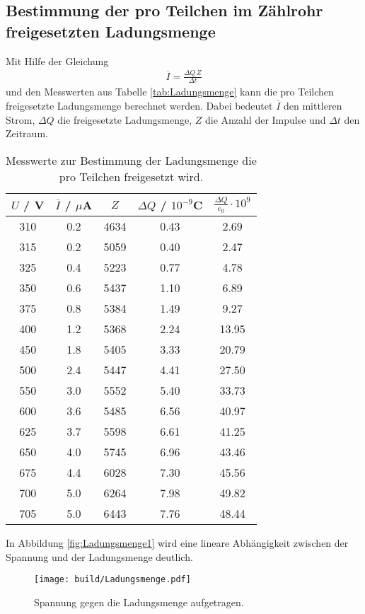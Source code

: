 \subsection{Bestimmung der pro Teilchen im Zählrohr freigesetzten Ladungsmenge}
Mit Hilfe der Gleichung
\begin{align*}
  \overline{I} = \frac{\Delta Q\,Z}{\Delta t}
\end{align*}
und den Messwerten aus Tabelle \eqref{tab:Ladungsmenge} kann die pro Teilchen freigesetzte Ladungsmenge berechnet werden. Dabei bedeutet $\overline{I}$ den mittleren Strom, $\Delta Q$ die freigesetzte Ladungsmenge, $Z$ die Anzahl der Impulse und $\Delta t$ den Zeitraum.

\begin{table}[H]
  \centering
  \begin{tabular}{c|c|c|c|c}
    \hline
    $U$ / V & $\overline{I}$ / $\mu$A & $Z$ & $\Delta Q$ / $10^{-9}$C & $\frac{\Delta Q}{e_0}\cdot10^{9}$ \\
    \hline
    310 & 0.2 & 4634 & 0.43 &  2.69 \\
    315 & 0.2 & 5059 & 0.40 &  2.47 \\
    325 & 0.4 & 5223 & 0.77 &  4.78 \\
    350 & 0.6 & 5437 & 1.10 &  6.89 \\
    375 & 0.8 & 5384 & 1.49 &  9.27 \\
    400 & 1.2 & 5368 & 2.24 & 13.95 \\
    450 & 1.8 & 5405 & 3.33 & 20.79 \\
    500 & 2.4 & 5447 & 4.41 & 27.50 \\
    550 & 3.0 & 5552 & 5.40 & 33.73 \\
    600 & 3.6 & 5485 & 6.56 & 40.97 \\
    625 & 3.7 & 5598 & 6.61 & 41.25 \\
    650 & 4.0 & 5745 & 6.96 & 43.46 \\
    675 & 4.4 & 6028 & 7.30 & 45.56 \\
    700 & 5.0 & 6264 & 7.98 & 49.82 \\
    705 & 5.0 & 6443 & 7.76 & 48.44 \\
  \end{tabular}
  \caption{Messwerte zur Bestimmung der Ladungsmenge die pro Teilchen freigesetzt wird.}
  \label{tab:Ladungsmenge}
\end{table}

In Abbildung \eqref{fig:Ladungsmenge1} wird eine lineare Abhängigkeit zwischen der Spannung und der Ladungsmenge deutlich.

\begin{figure}[H]
  \centering
  \texttt{[image: build/Ladungsmenge.pdf]}
  \caption{Spannung gegen die Ladungsmenge aufgetragen.}
  \label{fig:Ladungsmenge1}
\end{figure}
